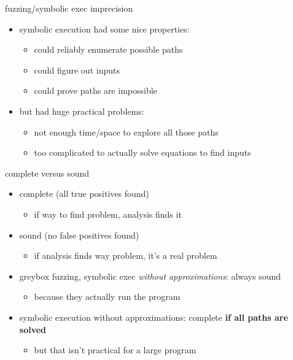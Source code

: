 \begin{frame}{fuzzing/symbolic exec imprecision}
    \begin{itemize}
    \item symbolic execution had some nice properties:
        \begin{itemize}
        \item could reliably enumerate possible paths
        \item could figure out inputs
        \item could prove paths are impossible
        \end{itemize}
    \item but had huge practical problems:
        \begin{itemize}
        \item not enough time/space to explore all those paths
        \item too complicated to actually solve equations to find inputs
        \end{itemize}
    \end{itemize}
\end{frame}

\begin{frame}{complete versus sound}
    \begin{itemize}
        \item complete (all true positives found)
            \begin{itemize}
            \item if way to find problem, analysis finds it
            \end{itemize}
        \item sound (no false positives found)
            \begin{itemize}
            \item if analysis finds way problem, it's a real problem
            \end{itemize}
        \vspace{.5cm}
        \item greybox fuzzing, symbolic exec \textit{without approximations}: always sound
            \begin{itemize}
            \item because they actually run the program
            \end{itemize}
        \item symbolic execution without approximations: complete \textbf{if all paths are solved}
            \begin{itemize}
            \item but that isn't practical for a large program
            \end{itemize}
    \end{itemize}
\end{frame}

